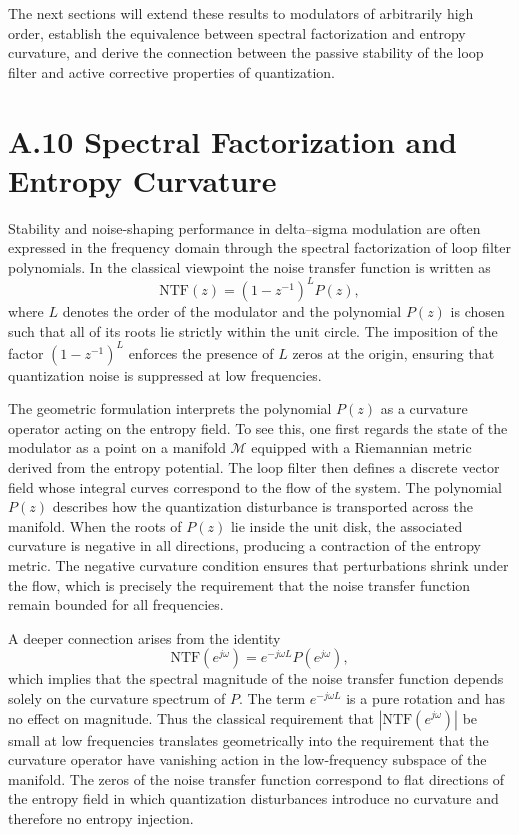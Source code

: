 The next sections will extend these results to modulators of arbitrarily high order, establish the equivalence between spectral factorization and entropy curvature, and derive the connection between the passive stability of the loop filter and active corrective properties of quantization.

\section{A.10 Spectral Factorization and Entropy Curvature}

Stability and noise-shaping performance in delta–sigma modulation are often expressed in the frequency domain through the spectral factorization of loop filter polynomials. In the classical viewpoint the noise transfer function is written as
\[
\mathrm{NTF}(z) = (1 - z^{-1})^L P(z),
\]
where \(L\) denotes the order of the modulator and the polynomial \(P(z)\) is chosen such that all of its roots lie strictly within the unit circle. The imposition of the factor \((1 - z^{-1})^L\) enforces the presence of \(L\) zeros at the origin, ensuring that quantization noise is suppressed at low frequencies. 

The geometric formulation interprets the polynomial \(P(z)\) as a curvature operator acting on the entropy field. To see this, one first regards the state of the modulator as a point on a manifold \(\mathcal{M}\) equipped with a Riemannian metric derived from the entropy potential. The loop filter then defines a discrete vector field whose integral curves correspond to the flow of the system. The polynomial \(P(z)\) describes how the quantization disturbance is transported across the manifold. When the roots of \(P(z)\) lie inside the unit disk, the associated curvature is negative in all directions, producing a contraction of the entropy metric. The negative curvature condition ensures that perturbations shrink under the flow, which is precisely the requirement that the noise transfer function remain bounded for all frequencies.

A deeper connection arises from the identity
\[
\mathrm{NTF}(e^{j\omega}) = e^{-j\omega L} P(e^{j\omega}),
\]
which implies that the spectral magnitude of the noise transfer function depends solely on the curvature spectrum of \(P\). The term \(e^{-j\omega L}\) is a pure rotation and has no effect on magnitude. Thus the classical requirement that \(|\mathrm{NTF}(e^{j\omega})|\) be small at low frequencies translates geometrically into the requirement that the curvature operator have vanishing action in the low-frequency subspace of the manifold. The zeros of the noise transfer function correspond to flat directions of the entropy field in which quantization disturbances introduce no curvature and therefore no entropy injection.

